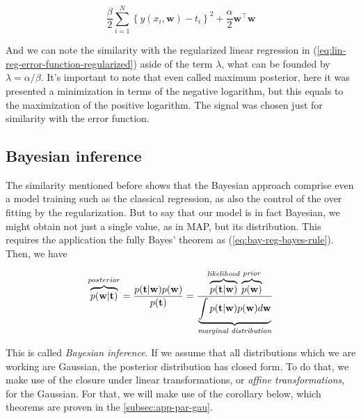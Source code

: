 \documentclass[11pt]{article} %
\begin{document}
\begin{equation}
    \frac{\beta}{2} \sum_{i=1}^{N}\left\{y\left(x_{i}, \mathbf{w}\right)-t_{i}\right\}^{2} + \frac{\alpha}{2} \mathbf{w}^\top \mathbf{w}
\end{equation}

And we can note the similarity with the regularized linear regression in (\ref{eq:lin-reg-error-function-regularized}) aside of the term $\lambda$, what can be founded by $\lambda=\alpha / \beta$. It's important to note that even called maximum posterior, here it was presented a minimization in terms of the negative logarithm, but this equals to the maximization of the positive logarithm. The signal was chosen just for similarity with the error function.

\subsection{Bayesian inference}

The similarity mentioned before shows that the Bayesian approach comprise even a model training such as the classical regression, as also the control of the over fitting by the regularization. But to say that our model is in fact Bayesian, we might obtain not just a single value, as in MAP, but its distribution. This requires the application the fully Bayes' theorem as (\ref{eq:bay-reg-bayes-rule}). Then, we have

\begin{equation}
   \overbrace{p(\mathbf{w}|\mathbf{t})}^{posterior} = \frac{p(\mathbf{t}|\mathbf{w}) p(\mathbf{w})}{p(\mathbf{t})} = \frac{\overbrace{p(\mathbf{t}|\mathbf{w})}^{\text{\textit{likelihood}}} \overbrace{p(\mathbf{w})}^{\text{\textit{prior}}}}{\underbrace{\int p(\mathbf{t}|\mathbf{w}) p(\mathbf{w}) d\mathbf{w}}_{\text{\textit{marginal distribution}}}}
\end{equation}

This is called \textit{Bayesian inference}. If we assume that all distributions which we are working are Gaussian, the posterior distribution has closed form. To do that, we make use of the closure under linear transformations, or \textit{affine transformations}, for the Gaussian. For that, we will make use of the corollary below, which theorems are proven in the \autoref{subsec:app-par-gau}.
\end{document}
